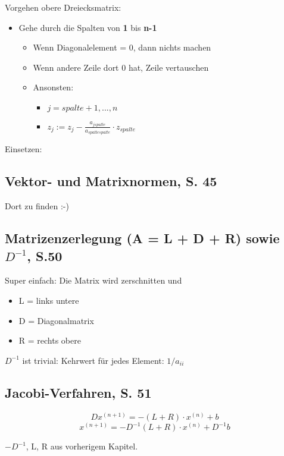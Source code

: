 Vorgehen obere Dreiecksmatrix:
\begin{itemize}
\item Gehe durch die Spalten von \textbf{1} bis \textbf{n-1}
\begin{itemize}
\item Wenn Diagonalelement = 0, dann nichts machen
\item Wenn andere Zeile dort 0 hat, Zeile vertauschen
\item Ansonsten:
\begin{itemize}
\item $j = spalte + 1, ..., n$
\item $z_j := z_j - \frac{a_{jspalte}}{a_{spaltespalte}} \cdot z_{spalte}$
\end{itemize}
\end{itemize}
\end{itemize}
Einsetzen:

\subsection{Vektor- und Matrixnormen, S. 45}
Dort zu finden :-)

\subsection{Matrizenzerlegung (A = L + D + R) sowie $D^{-1}$, S.50}
Super einfach: Die Matrix wird zerschnitten und
\begin{itemize}
\item L = links untere
\item D = Diagonalmatrix
\item R = rechts obere
\end{itemize}

$D^{-1}$ ist trivial: Kehrwert für jedes Element: $1/a_{ii}$

\subsection{Jacobi-Verfahren, S. 51}

\[D{x^{(n+1)}} = - (L+R) \cdot x^{(n)} + b\]
\[{x^{(n+1)}} = -D^{-1} (L+R) \cdot x^{(n)} + D^{-1} b\]

$-D^{-1}$, L, R aus vorherigem Kapitel.
